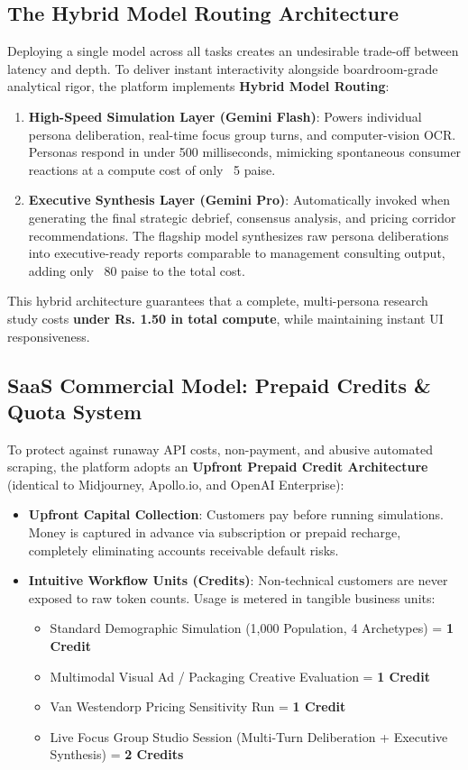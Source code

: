 \documentclass[11pt,a4paper]{article}
\begin{document}
\subsection{The Hybrid Model Routing Architecture}
Deploying a single model across all tasks creates an undesirable trade-off between latency and depth. To deliver instant interactivity alongside boardroom-grade analytical rigor, the platform implements \textbf{Hybrid Model Routing}:
\begin{enumerate}[noitemsep]
  \item \textbf{High-Speed Simulation Layer (Gemini Flash)}: Powers individual persona deliberation, real-time focus group turns, and computer-vision OCR. Personas respond in under 500 milliseconds, mimicking spontaneous consumer reactions at a compute cost of only ~5 paise.
  \item \textbf{Executive Synthesis Layer (Gemini Pro)}: Automatically invoked when generating the final strategic debrief, consensus analysis, and pricing corridor recommendations. The flagship model synthesizes raw persona deliberations into executive-ready reports comparable to management consulting output, adding only ~80 paise to the total cost.
\end{enumerate}
This hybrid architecture guarantees that a complete, multi-persona research study costs \textbf{under Rs. 1.50 in total compute}, while maintaining instant UI responsiveness.

\subsection{SaaS Commercial Model: Prepaid Credits \& Quota System}
To protect against runaway API costs, non-payment, and abusive automated scraping, the platform adopts an \textbf{Upfront Prepaid Credit Architecture} (identical to Midjourney, Apollo.io, and OpenAI Enterprise):
\begin{itemize}[noitemsep]
  \item \textbf{Upfront Capital Collection}: Customers pay before running simulations. Money is captured in advance via subscription or prepaid recharge, completely eliminating accounts receivable default risks.
  \item \textbf{Intuitive Workflow Units (Credits)}: Non-technical customers are never exposed to raw token counts. Usage is metered in tangible business units:
    \begin{itemize}[noitemsep]
      \item Standard Demographic Simulation (1,000 Population, 4 Archetypes) = \textbf{1 Credit}
      \item Multimodal Visual Ad / Packaging Creative Evaluation = \textbf{1 Credit}
      \item Van Westendorp Pricing Sensitivity Run = \textbf{1 Credit}
      \item Live Focus Group Studio Session (Multi-Turn Deliberation + Executive Synthesis) = \textbf{2 Credits}
    \end{itemize}
\end{itemize}
\end{document}
